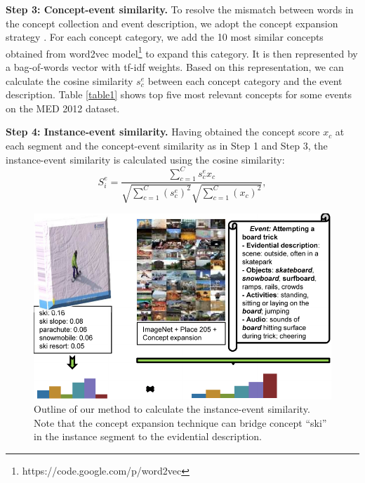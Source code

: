\textbf{Step 3: Concept-event similarity.} To resolve the mismatch between words in the concept collection and event description, we adopt the concept expansion strategy \cite{chen2014event}. For each concept category, we add the 10 most similar concepts obtained from word2vec\cite{mikolov2013efficient} model\footnote{https://code.google.com/p/word2vec} to expand this category. It is then represented by a bag-of-words vector with tf-idf weights. Based on this representation, we can calculate the cosine similarity $s_{c}^{e}$ between each concept category and the event description. Table \ref{table1} shows top five most relevant concepts for some events on the MED 2012 dataset.   

\textbf{Step 4: Instance-event similarity.} Having obtained the concept score $x_{c}$ at each segment and the concept-event similarity as in Step 1 and Step 3, the instance-event similarity is calculated using the cosine similarity:
\begin{equation}
\label{eq1}
S_{i}^{e}=\frac{\sum_{c=1}^{C}s_{c}^{e}x_{c}}{\sqrt{\sum_{c=1}^{C}(s_{c}^{e})^{2}}\sqrt{\sum_{c=1}^{C}(x_{c})^{2}}},
\end{equation}
\begin{figure}
	\centering
	\includegraphics[width=1\textwidth]{figure_2.pdf}
	\caption{Outline of our method to calculate the instance-event similarity. Note that the concept expansion technique can bridge concept ``ski'' in the instance segment to the evidential description.}
	\label{c5_figure_2}
\end{figure}


